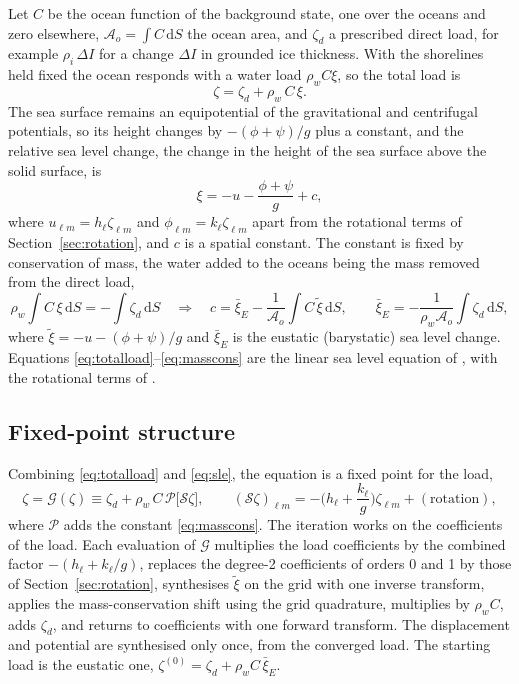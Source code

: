 \documentclass[11pt,a4paper]{article}
\newcommand{\dd}{\mathrm{d}}
\numberwithin{equation}{section}
\begin{document}
Let $C$ be the ocean function of the background state, one over the oceans and
zero elsewhere, $\mathcal{A}_{o}=\int C\,\dd S$ the ocean area, and $\zeta_{d}$ a
prescribed direct load, for example $\rho_{i}\,\Delta I$ for a change $\Delta I$
in grounded ice thickness. With the shorelines held fixed the ocean responds
with a water load $\rho_{w}C\xi$, so the total load is
\begin{equation}
\zeta = \zeta_{d} + \rho_{w}\,C\,\xi.
\label{eq:totalload}
\end{equation}
The sea surface remains an equipotential of the gravitational and centrifugal
potentials, so its height changes by $-(\phi+\psi)/g$ plus a constant, and the
relative sea level change, the change in the height of the sea surface above
the solid surface, is
\begin{equation}
\xi = -u - \frac{\phi+\psi}{g} + c,
\label{eq:sle}
\end{equation}
where $u_{\ell m}=h_{\ell}\zeta_{\ell m}$ and $\phi_{\ell m}=k_{\ell}\zeta_{\ell m}$
apart from the rotational terms of Section~\ref{sec:rotation}, and $c$ is a
spatial constant. The constant is fixed by conservation of mass, the water added
to the oceans being the mass removed from the direct load,
\begin{equation}
\rho_{w}\int C\,\xi\,\dd S = -\int\zeta_{d}\,\dd S
\quad\Longrightarrow\quad
c = \bar\xi_{E} - \frac{1}{\mathcal{A}_{o}}\int C\,\tilde\xi\,\dd S,
\qquad \bar\xi_{E} = -\frac{1}{\rho_{w}\mathcal{A}_{o}}\int\zeta_{d}\,\dd S,
\label{eq:masscons}
\end{equation}
where $\tilde\xi=-u-(\phi+\psi)/g$ and $\bar\xi_{E}$ is the eustatic (barystatic)
sea level change. Equations \eqref{eq:totalload}--\eqref{eq:masscons} are the
linear sea level equation of \citet{FarrellClark1976}, with the rotational terms
of \citet{MilneMitrovica1998}.

\subsection{Fixed-point structure}

Combining \eqref{eq:totalload} and \eqref{eq:sle}, the equation is a fixed point
for the load,
\begin{equation}
\zeta = \mathcal{G}(\zeta) \equiv \zeta_{d} + \rho_{w}\,C\,\mathcal{P}\big[\mathcal{S}\zeta\big],
\qquad
(\mathcal{S}\zeta)_{\ell m} = -\Big(h_{\ell}+\frac{k_{\ell}}{g}\Big)\zeta_{\ell m}
+ (\text{rotation}),
\label{eq:fixedpoint}
\end{equation}
where $\mathcal{P}$ adds the constant \eqref{eq:masscons}. The iteration works
on the coefficients of the load. Each evaluation of $\mathcal{G}$ multiplies
the load coefficients by the combined factor $-(h_{\ell}+k_{\ell}/g)$, replaces
the degree-2 coefficients of orders 0 and 1 by those of
Section~\ref{sec:rotation}, synthesises $\tilde\xi$ on the grid with one inverse
transform, applies the mass-conservation shift using the grid quadrature,
multiplies by $\rho_{w}C$, adds $\zeta_{d}$, and returns to coefficients with
one forward transform. The displacement and potential are synthesised only
once, from the converged load. The starting load is the eustatic one,
$\zeta^{(0)} = \zeta_{d}+\rho_{w}C\,\bar\xi_{E}$.
\end{document}
